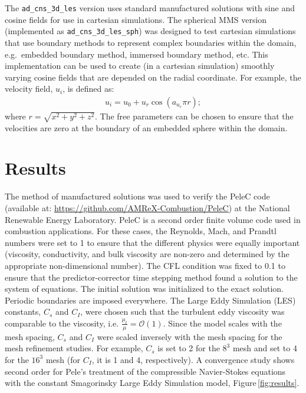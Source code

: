 \documentclass[10pt]{article}
\begin{document}
The \texttt{ad\_cns\_3d\_les} version uses standard manufactured
solutions with sine and cosine fields for use in cartesian
simulations. The spherical MMS version (implemented as
\texttt{ad\_cns\_3d\_les\_sph}) was designed to test cartesian
simulations that use boundary methods to represent complex boundaries
within the domain, e.g.\ embedded boundary method, immersed boundary
method, etc. This implementation can be used to create (in a cartesian
simulation) smoothly varying cosine fields that are depended on the
radial coordinate. For example, the velocity field, $u_i$, is defined
as:
\begin{align}
u_i = u_0 + u_r \cos(a_{u_r} \pi r);
\end{align}
where $r = \sqrt{x^2 + y^2+z^2}$. The free parameters can be chosen to
ensure that the velocities are zero at the boundary of an embedded
sphere within the domain.

\section{Results}

The method of manufactured solutions was used to verify the PeleC code
(available at:
\href{https://github.com/AMReX-Combustion/PeleC}{https://github.com/AMReX-Combustion/PeleC})
at the National Renewable Energy Laboratory. PeleC is a second order
finite volume code used in combustion applications. For these cases,
the Reynolds, Mach, and Prandtl numbers were set to 1 to ensure that
the different physics were equally important (viscosity, conductivity,
and bulk viscosity are non-zero and determined by the appropriate
non-dimensional number). The CFL condition was fixed to 0.1 to ensure
that the predictor-corrector time stepping method found a solution to
the system of equations. The initial solution was initialized to the
exact solution. Periodic boundaries are imposed everywhere. The Large
Eddy Simulation (LES) constants, $C_s$ and $C_I$, were chosen such
that the turbulent eddy viscosity was comparable to the viscosity,
i.e. $\frac{\mu_t}{\mu} = \mathcal{O}(1)$. Since the model scales with
the mesh spacing, $C_s$ and $C_I$ were scaled inversely with the mesh
spacing for the mesh refinement studies. For example, $C_s$ is set to
2 for the $8^3$ mesh and set to 4 for the $16^3$ mesh (for $C_I$, it
is 1 and 4, respectively). A convergence study shows second order for
Pele's treatment of the compressible Navier-Stokes equations with the
constant Smagorinsky Large Eddy Simulation model,
Figure\,\ref{fig:results}.
\end{document}
